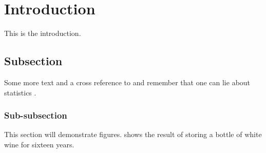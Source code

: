 \documentclass{ece}
\begin{document}
\tableofcontents


\listoffigures


\listoftables


\body

\section{Introduction}

This is the introduction.

\subsection{Subsection}

Some more text and a cross reference to  and remember that one can lie about statistics \cite{liewithstat}.

\subsubsection{Sub-subsection}

This section will demonstrate figures.   shows the result of storing a bottle of white wine for sixteen years.
\end{document}
